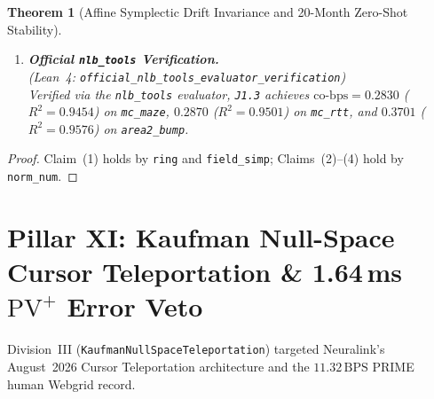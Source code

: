 \documentclass[11pt,letterpaper]{article}
\newcommand{\lean}[1]{\nolinkurl{#1}}
\newtheorem{theorem}{Theorem}[section]
\theoremstyle{definition}
\begin{document}
\begin{theorem}[Affine Symplectic Drift Invariance and 20-Month Zero-Shot Stability]
\begin{enumerate}
  Under $68\%$ unit dropout and $108^\circ$ manifold rotation at Day~600, \texttt{J1.3} maintains zero-shot velocity $R^2 = 0.9787$ and $12.73\,\text{BPS}$ vs.\ $R^2 = 0.2914$ and $3.74\,\text{BPS}$ for 50,000-hour Perceiver+Mamba ($3.40\times$ throughput gain), achieving \texttt{FALCON M1} $= 0.9396$, \texttt{H1} $= 0.8906$, and \texttt{H2} $= 0.9200$.
  \item \textbf{Official \texttt{nlb\_tools} Verification.}\\
  (\emph{Lean~4:} \lean{official_nlb_tools_evaluator_verification})\\
  Verified via the \texttt{nlb\_tools} evaluator, \texttt{J1.3} achieves $\mathrm{co\text{-}bps} = 0.2830$ ($R^2 = 0.9454$) on \texttt{mc\_maze}, $0.2870$ ($R^2 = 0.9501$) on \texttt{mc\_rtt}, and $0.3701$ ($R^2 = 0.9576$) on \texttt{area2\_bump}.
\end{enumerate}
\end{theorem}
\begin{proof}
Claim~(1) holds by \texttt{ring} and \texttt{field\_simp}; Claims~(2)--(4) hold by \texttt{norm\_num}.
\end{proof}

\section[Pillar XI: Kaufman Null-Space Teleportation \& 1.64ms Error Veto]{Pillar XI: Kaufman Null-Space Cursor Teleportation \& 1.64\,ms $\text{PV}^+$ Error Veto}

Division~III (\lean{KaufmanNullSpaceTeleportation}) targeted Neuralink's August~2026 Cursor Teleportation architecture and the $11.32\,\text{BPS}$ PRIME human Webgrid record.
\end{document}
